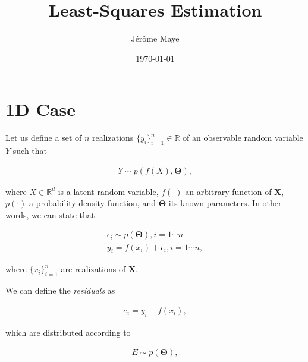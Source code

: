 \documentclass[12pt]{article}
\title{Least-Squares Estimation}
\author{J\'{e}r\^{o}me Maye}
\date{\today}
\begin{document}
  \maketitle

  \section{1D Case}
    Let us define a set of $n$ realizations $\{y_i\}_{i=1}^n\in\mathbb{R}$ of an
    observable random variable $Y$ such that

    \begin{equation}\label{eqn:model1d}
      \begin{aligned}
        Y \sim p(f(X),\boldsymbol{\Theta}),
      \end{aligned}
    \end{equation}

    \noindent where $X\in\mathbb{R}^d$ is a latent random variable, $f(\cdot)$
    an arbitrary function of $\mathbf{X}$, $p(\cdot)$ a probability density
    function, and $\boldsymbol{\Theta}$ its known parameters. In other words, we
    can state that

    \begin{equation}\label{eqn:model1dreal}
      \begin{aligned}
        \epsilon_i \sim p(\boldsymbol{\Theta}), i = 1\cdots n\\
        y_i = f(x_i) + \epsilon_i, i=1\cdots n,
      \end{aligned}
    \end{equation}

    \noindent where $\{x_i\}_{i=1}^n$ are realizations of $\mathbf{X}$.

    We can define the \emph{residuals} as

    \begin{equation}\label{eqn:model1dres}
      \begin{aligned}
      e_i = y_i - f(x_i),
      \end{aligned}
    \end{equation}

    \noindent which are distributed according to

    \begin{equation}\label{eqn:model1dresdist}
      \begin{aligned}
      E \sim p(\boldsymbol{\Theta}),
      \end{aligned}
    \end{equation}
\end{document}
